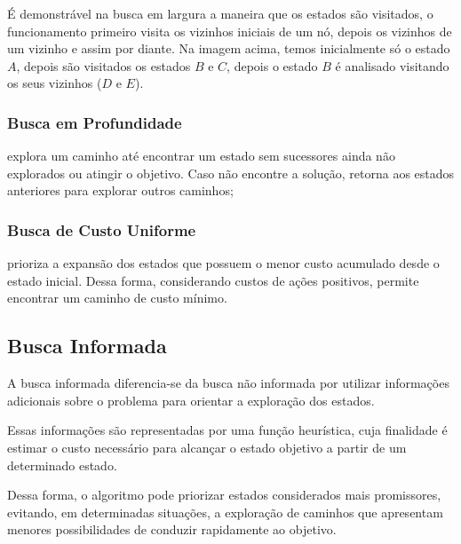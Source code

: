 \begin{figure}[H]
\begin{minipage}{0.30\textwidth}
	\end{minipage}
	

\end{figure}
É demonstrável na busca em largura a maneira que os estados são visitados, o funcionamento primeiro visita os vizinhos iniciais de um nó, depois os vizinhos de um vizinho e assim por diante. Na imagem acima, temos inicialmente só o estado $A$, depois são visitados os estados $B$ e $C$, depois o estado $B$ é analisado visitando os seus vizinhos ($D$ e $E$).
	
\subsubsection{Busca em Profundidade} explora um caminho até encontrar um estado sem sucessores ainda não explorados ou atingir o objetivo. Caso não encontre a solução, retorna aos estados anteriores para explorar outros caminhos;

\subsubsection{Busca de Custo Uniforme} 

prioriza a expansão dos estados que possuem o menor custo acumulado desde o estado inicial. Dessa forma, considerando custos de ações positivos, permite encontrar um caminho de custo mínimo.



\subsection{Busca Informada}

A busca informada diferencia-se da busca não informada por utilizar informações adicionais sobre o problema para orientar a exploração dos estados.

Essas informações são representadas por uma função heurística, cuja finalidade é estimar o custo necessário para alcançar o estado objetivo a partir de um determinado estado.

Dessa forma, o algoritmo pode priorizar estados considerados mais promissores, evitando, em determinadas situações, a exploração de caminhos que apresentam menores possibilidades de conduzir rapidamente ao objetivo.

